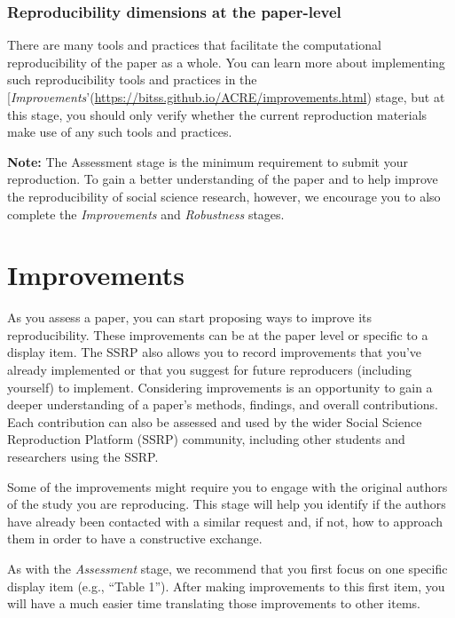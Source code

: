 \documentclass[
]{book}
\begin{document}
\hypertarget{reproducibility-dimensions-at-the-paper-level}{%
\subsection{Reproducibility dimensions at the paper-level}\label{reproducibility-dimensions-at-the-paper-level}}

There are many tools and practices that facilitate the computational reproducibility of the paper as a whole. You can learn more about implementing such reproducibility tools and practices in the {[}\emph{Improvements}'(\url{https://bitss.github.io/ACRE/improvements.html}) stage, but at this stage, you should only verify whether the current reproduction materials make use of any such tools and practices.

\textbf{Note:} The Assessment stage is the minimum requirement to submit your reproduction. To gain a better understanding of the paper and to help improve the reproducibility of social science research, however, we encourage you to also complete the \emph{Improvements} and \emph{Robustness} stages.

\hypertarget{improvements}{%
\chapter{Improvements}\label{improvements}}

As you assess a paper, you can start proposing ways to improve its reproducibility. These improvements can be at the paper level or specific to a display item. The SSRP also allows you to record improvements that you've already implemented or that you suggest for future reproducers (including yourself) to implement. Considering improvements is an opportunity to gain a deeper understanding of a paper's methods, findings, and overall contributions. Each contribution can also be assessed and used by the wider Social Science Reproduction Platform (SSRP) community, including other students and researchers using the SSRP.

Some of the improvements might require you to engage with the original authors of the study you are reproducing. This stage will help you identify if the authors have already been contacted with a similar request and, if not, how to approach them in order to have a constructive exchange.

As with the \emph{Assessment} stage, we recommend that you first focus on one specific display item (e.g., ``Table 1''). After making improvements to this first item, you will have a much easier time translating those improvements to other items.
\end{document}
